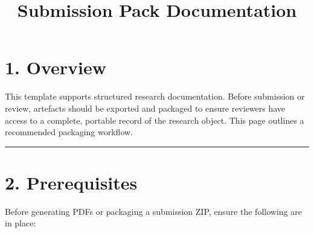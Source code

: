 \documentclass[
]{report}
\title{Submission Pack Documentation}
\author{}
\date{}
\renewcommand*\contentsname{Table of contents}
\newcommand\contentsname{Table of contents}
\begin{document}
\maketitle

\renewcommand*\contentsname{Table of contents}
{
\hypersetup{linkcolor=}
\setcounter{tocdepth}{2}
\tableofcontents
}

\chapter{1. Overview}\label{overview}

This template supports structured research documentation. Before
submission or review, artefacts should be exported and packaged to
ensure reviewers have access to a complete, portable record of the
research object. This page outlines a recommended packaging workflow.

\begin{center}\rule{0.5\linewidth}{0.5pt}\end{center}

\chapter{2. Prerequisites}\label{prerequisites}

Before generating PDFs or packaging a submission ZIP, ensure the
following are in place:
\end{document}
